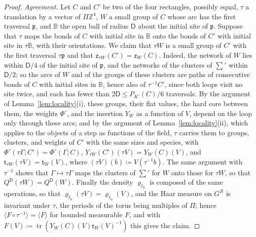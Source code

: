 \documentclass[11pt]{preprint}
\newcommand{\tr}{\operatorname{tr}}
\numberwithin{equation}{section}
\theoremstyle{definition}
\theoremstyle{remark}
\theoremstyle{plain}
\begin{document}
\begin{proof}
\emph{Agreement.} Let $C$ and $C'$ be two of the four rectangles, possibly equal, $\tau$ a translation by a vector of $\Pi\mathbb Z^4$, $W$ a small group of $C$ whose arc has the first traversal $\mathfrak p$, and $\mathbb B$ the open ball of radius $\mathsf D$ about the initial site of $\mathfrak p$. Suppose that $\tau$ maps the bonds of $C$ with initial site in $\mathbb B$ onto the bonds of $C'$ with initial site in $\tau\mathbb B$, with their orientations. We claim that $\tau W$ is a small group of $C'$ with the first traversal $\tau\mathfrak p$ and that $\mathsf z_{\tau W}(C') = \mathsf z_W(C)$. Indeed, the network of $W$ lies within $\mathsf D/4$ of the initial site of $\mathfrak p$, and the networks of the clusters of $\sum'$ within $\mathsf D/2$; so the arcs of $W$ and of the groups of these clusters are paths of consecutive bonds of $C$ with initial sites in $\mathbb B$, hence also of $\tau^{-1}C'$, since both loops visit no site twice, and each has fewer than $2\mathsf D \leq P_{K'}(C)/6$ traversals. By the argument of Lemma~\ref{lem:locality}(i), these groups, their flat values, the hard core between them, the weights $\Phi^\circ$, and the insertion $Y_W$ as a function of $V$, depend on the loop only through these arcs; and by the argument of Lemma~\ref{lem:locality}(ii), which applies to the objects of a step as functions of the field, $\tau$ carries them to groups, clusters, and weights of $C'$ with the same sizes and species, with $\Phi^\circ(\tau\Gamma; C') = \Phi^\circ(\Gamma; C)$, $Y_{\tau W}(C')(\tau V) = Y_W(C)(V)$, and $\mathsf t_{\tau W}(\tau V) = \mathsf t_W(V)$, where $(\tau V)(b) \coloneqq V(\tau^{-1}b)$. The same argument with $\tau^{-1}$ shows that $\Gamma \mapsto \tau\Gamma$ maps the clusters of $\sum'$ for $W$ onto those for $\tau W$, so that $Q^{\mathsf D}(\tau W) = Q^{\mathsf D}(W)$. Finally the density $\varrho_{\ell_0}$ is composed of the same operations, so that $\varrho_{\ell_0}(\tau V) = \varrho_{\ell_0}(V)$, and the Haar measure on $G^{\mathcal B}$ is invariant under $\tau$, the periods of the torus being multiples of $\Pi$; hence $\langle F\circ\tau^{-1}\rangle = \langle F\rangle$ for bounded measurable $F$, and with $F(V) \coloneqq \tr(Y_W(C)(V)\mathsf t_W(V)^{-1})$ this gives the claim.


\end{proof}
\end{document}
